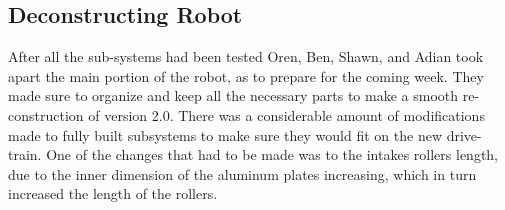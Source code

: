 \documentclass{article}
\begin{document}
\subsection{Deconstructing Robot}
After all the sub-systems had been tested Oren, Ben, Shawn, and Adian took apart the main portion of the robot, as to prepare for the coming week. They made sure to organize and keep all the necessary parts to make a smooth re-construction of version 2.0. There was a considerable amount of modifications made to fully built subsystems to make sure they would fit on the new drive-train. One of the changes that had to be made was to the intakes rollers length, due to the inner dimension of the aluminum plates increasing, which in turn increased the length of the rollers. 
\end{document}
